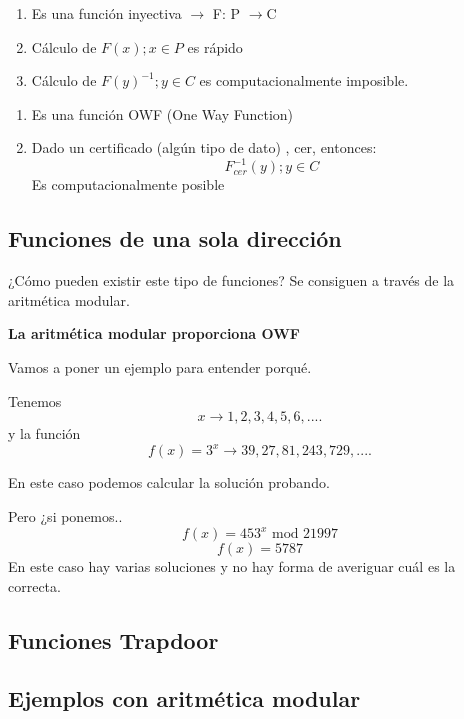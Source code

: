 \begin{defn}
	\begin{enumerate}
		\item Es una función inyectiva $\rightarrow$  F: P $\rightarrow$C
		\item Cálculo de $F(x); x\in P$ es rápido
		\item Cálculo de $F(y)^{-1} ; y\in C$ es computacionalmente imposible.
	\end{enumerate}
\end{defn}

\begin{defn}
	\begin{enumerate}
		\item Es una función OWF (One Way Function)
		\item Dado un certificado (algún tipo de dato) , cer, entonces: $$F^{-1}_{cer}(y) ; y \in C$$
		Es computacionalmente posible
	\end{enumerate}
\end{defn}



\subsection{Funciones de una sola dirección}
¿Cómo pueden existir este tipo de funciones? Se consiguen a través de la aritmética modular.

\textbf{La aritmética modular proporciona OWF}

Vamos a poner un ejemplo para entender porqué.

\begin{example}
	
	Tenemos 
	$$x \rightarrow 1, 2, 3, 4, 5, 6, ....$$
	y la función
	$$f(x) = 3^x \rightarrow 39 , 27, 81 , 243, 729, ....$$
	
	En este caso podemos calcular la solución probando.
	
	Pero ¿si ponemos..
	$$f(x)  = 453^x \text{ mod }21997$$
	$$f(x) = 5787$$
	En este caso hay varias soluciones y no hay forma de averiguar cuál es la correcta. 
\end{example}
\subsection{Funciones Trapdoor}
\subsection{Ejemplos con aritmética modular}
